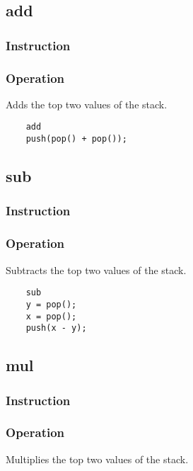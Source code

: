 \subsection{add}
\subsubsection{Instruction}

\subsubsection{Operation}
Adds the top two values of the stack.

	\begin{lstlisting}
	add
	push(pop() + pop());
	\end{lstlisting}

\subsection{sub}
\subsubsection{Instruction}

\subsubsection{Operation}
Subtracts the top two values of the stack.

	\begin{lstlisting}
	sub
	y = pop();
	x = pop();
	push(x - y);
	\end{lstlisting}

\subsection{mul}
\subsubsection{Instruction}

\subsubsection{Operation}
Multiplies the top two values of the stack.

